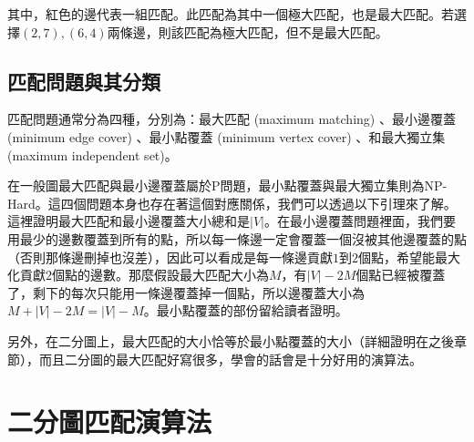 \documentclass[main.tex]{subfiles}
\begin{document}
其中，紅色的邊代表一組匹配。此匹配為其中一個極大匹配，也是最大匹配。若選擇$(2, 7), (6, 4)$兩條邊，則該匹配為極大匹配，但不是最大匹配。

\subsection{匹配問題與其分類}
匹配問題通常分為四種，分別為：最大匹配 (maximum matching) 、最小邊覆蓋 (minimum edge cover) 、最小點覆蓋 (minimum vertex cover) 、和最大獨立集 (maximum independent set)。
\par 在一般圖最大匹配與最小邊覆蓋屬於P問題，最小點覆蓋與最大獨立集則為NP-Hard。這四個問題本身也存在著這個對應關係，我們可以透過以下引理來了解。
這裡證明最大匹配和最小邊覆蓋大小總和是$|V|$。在最小邊覆蓋問題裡面，我們要用最少的邊數覆蓋到所有的點，所以每一條邊一定會覆蓋一個沒被其他邊覆蓋的點（否則那條邊刪掉也沒差），因此可以看成是每一條邊貢獻$1$到$2$個點，希望能最大化貢獻$2$個點的邊數。那麼假設最大匹配大小為$M$，有$|V| - 2M$個點已經被覆蓋了，剩下的每次只能用一條邊覆蓋掉一個點，所以邊覆蓋大小為$M + |V| - 2M = |V| - M$。最小點覆蓋的部份留給讀者證明。
\par 另外，在二分圖上，最大匹配的大小恰等於最小點覆蓋的大小（詳細證明在之後章節），而且二分圖的最大匹配好寫很多，學會的話會是十分好用的演算法。

\section{二分圖匹配演算法}
\end{document}
